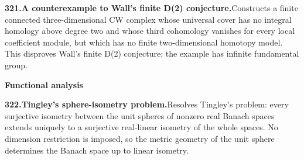 \documentclass[11pt,a4paper]{article}
\begin{document}
  \par \begin{minipage}{\linewidth}
  \fontsize{10.5}{12.6}\selectfont\RaggedRight
  \hypertarget{result 321}{}
  {\bfseries\textcolor{muted}{321.}\enspace A counterexample to Wall's finite D(2) conjecture.}\enspace Constructs a finite connected three-dimensional CW complex whose universal cover has no integral homology above degree two and whose third cohomology vanishes for every local coefficient module, but which has no finite two-dimensional homotopy model. This disproves Wall's finite D(2) conjecture; the example has infinite fundamental group.\par
  \end{minipage}\par\vspace{5pt}



  \par{}\addvspace{12pt}
  \hypertarget{subject 11}{}\label{subject 11}
  {\fontsize{15}{18}\selectfont\bfseries Functional analysis\par}
  \nobreak\vspace{9pt}\nobreak



  \par \begin{minipage}{\linewidth}
  \fontsize{10.5}{12.6}\selectfont\RaggedRight
  \hypertarget{result 322}{}
  {\bfseries\textcolor{muted}{322.}\enspace Tingley's sphere-isometry problem.}\enspace Resolves Tingley's problem: every surjective isometry between the unit spheres of nonzero real Banach spaces extends uniquely to a surjective real-linear isometry of the whole spaces. No dimension restriction is imposed, so the metric geometry of the unit sphere determines the Banach space up to linear isometry.\par
  \end{minipage}\par\vspace{5pt}
\end{document}
